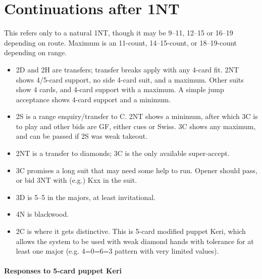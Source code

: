 \documentclass[a4paper,12pt]{article}
\begin{document}
\section{Continuations after 1NT}

This refers only to a natural 1NT, though it may be 9--11, 12--15 or 16--19
depending on route. Maximum is an 11-count, 14--15-count, or 18--19-count
depending on range.

\begin{itemize}

\item 2D and 2H are transfers; transfer breaks apply with any 4-card fit.  2NT
shows 4/5-card support, no side 4-card suit, and a maximum.  Other suits
show 4 cards, and 4-card support with a maximum.  A simple jump acceptance
shows 4-card support and a minimum.

\item 2S is a range enquiry/transfer to C.  2NT shows a minimum, after which 3C is to
play and other bids are GF, either cues or Swiss.  3C shows any maximum, and
can be passed if 2S was weak takeout.

\item 2NT is a transfer to diamonds; 3C is the only available super-accept.

\item 3C promises a long suit that may need some help to run.  Opener should
pass, or bid 3NT with (e.g.) Kxx in the suit.

\item 3D is 5--5 in the majors, at least invitational.

\item 4N is blackwood.

\item 2C is where it gets distinctive.  This is 5-card modified puppet Keri, which allows the system to be used with weak diamond hands with tolerance for at least one major (e.g. 4=0=6=3 pattern with very limited values).
\end{itemize}

\paragraph{Responses to 5-card puppet Keri}
\end{document}
